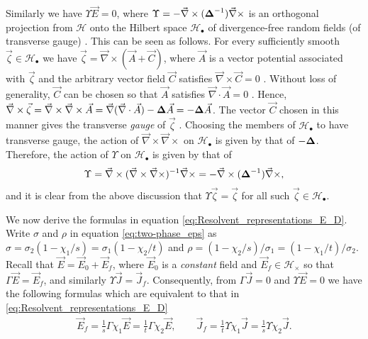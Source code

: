 \documentclass{cmslatex}
\newcommand\bDelta{\mbox{\boldmath${\Delta}$}}
\begin{document}
Similarly we have $\Upsilon\vec{E}=0$, where
$\Upsilon=-\vec{\nabla}\times(\bDelta^{-1})\vec{\nabla}\times$ is an orthogonal projection from 
$\mathscr{H}$ onto the Hilbert space 
$\mathscr{H}_{\bullet}$ of divergence-free random fields (of transverse
gauge) \cite{Murphy:JMP:063506}. This can be seen as  
follows. For every sufficiently smooth $\vec{\zeta}\in\mathscr{H}_\bullet$ we have
$\vec{\zeta}=\vec{\nabla}\times(\vec{A}+\vec{C})$, where $\vec{A}$ is a vector
potential associated with $\vec{\zeta}$ and the arbitrary vector field
$\vec{C}$ satisfies $\vec{\nabla}\times\vec{C}=0$ \cite{Jackson-1999}. Without
loss of generality, $\vec{C}$ can be chosen so that $\vec{A}$
satisfies $\vec{\nabla}\cdot\vec{A}=0$ \cite{Jackson-1999}. Hence,
$\vec{\nabla}\times\vec{\zeta}=\vec{\nabla}\times\vec{\nabla}\times\vec{A}
=\vec{\nabla}(\vec{\nabla}\cdot\vec{A})-\bDelta\vec{A}=-\bDelta\vec{A}$. The vector 
$\vec{C}$ chosen in this manner gives the transverse \emph{gauge} of
$\vec{\zeta}$ \cite{Jackson-1999}. Choosing the members of 
$\mathscr{H}_\bullet$ to have transverse gauge, the action of
$\vec{\nabla}\times\vec{\nabla}\times$ on $\mathscr{H}_\bullet$ is given by that of
$-\bDelta$. Therefore, the action of $\Upsilon$ on $\mathscr{H}_\bullet$ is given
by that of 
%
\begin{align}\label{eq:GammaCurl}
  \Upsilon=\vec{\nabla}\times(\vec{\nabla}\times\vec{\nabla}\times)^{-1}\vec{\nabla}\times
  =-\vec{\nabla}\times(\bDelta^{-1})\vec{\nabla}\times, 
\end{align}
%
and it is clear from the above discussion that $\Upsilon\vec{\zeta}=\vec{\zeta}$ for
all such $\vec{\zeta}\in\mathscr{H}_\bullet$.





We now derive the formulas in equation
\eqref{eq:Resolvent_representations_E_D}.
Write $\sigma$ and $\rho$ in 
equation \eqref{eq:two-phase_eps} as $\sigma=\sigma_2(1-\chi_1/s)=\sigma_1(1-\chi_2/t)$ and
$\rho=(1-\chi_2/s)/\sigma_1=(1-\chi_1/t)/\sigma_2$. Recall that
$\vec{E}=\vec{E}_0+\vec{E}_f$, where $\vec{E}_0$ is a \emph{constant}
field and $\vec{E}_f\in\mathscr{H}_\times$ so that
$\Gamma\vec{E}=\vec{E}_f$, and similarly
$\Upsilon\vec{J}=\vec{J}_f$. Consequently, from $\Gamma\vec{J}=0$ and $\Upsilon\vec{E}=0$
we have the following formulas which are equivalent to that in 
\eqref{eq:Resolvent_representations_E_D}  
% 
\begin{align}\label{eq:Proj_rep_Ef_Jf}
  \vec{E}_f=\frac{1}{s}\Gamma\chi_1\vec{E}=\frac{1}{t}\Gamma\chi_2\vec{E}, \qquad
  \vec{J}_f=\frac{1}{t}\Upsilon\chi_1\vec{J}=\frac{1}{s}\Upsilon\chi_2\vec{J}.
\end{align}
%
\end{document}
